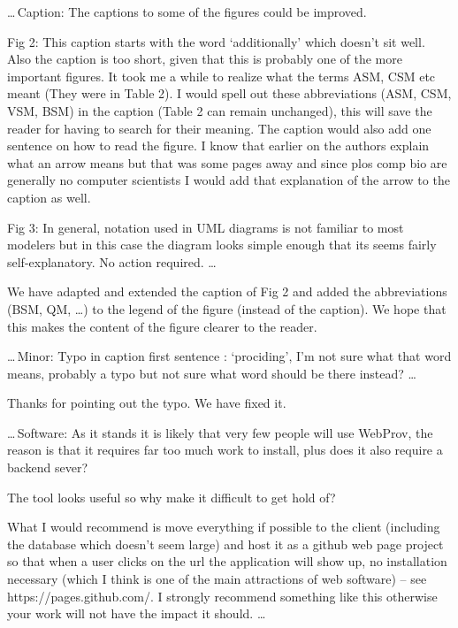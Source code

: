 \documentclass{article}
\begin{document}
\begin{mdframed}
\ldots\,Caption: The captions to some of the figures could be improved.

Fig 2: This caption starts with the word ‘additionally’ which doesn’t sit well.
Also the caption is too short, given that this is probably one of the more important figures.
It took me a while to realize what the terms ASM, CSM etc meant (They were in Table 2).
I would spell out these abbreviations (ASM, CSM, VSM, BSM) in the caption (Table 2 can remain unchanged), this will save the reader for having to search for their meaning.
The caption would also add one sentence on how to read the figure.
I know that earlier on the authors explain what an arrow means but that was some pages away and since plos comp bio are generally no computer scientists I would add that explanation of the arrow to the caption as well.

Fig 3: In general, notation used in UML diagrams is not familiar to most modelers but in this case the diagram looks simple enough that its seems fairly self-explanatory. No action required. \ldots
\end{mdframed}

We have adapted and extended the caption of Fig 2 and added the abbreviations (BSM, QM, \dots) to the legend of the figure (instead of the caption).
We hope that this makes the content of the figure clearer to the reader.


\begin{mdframed}
\ldots\,Minor: Typo in caption first sentence : ‘prociding’, I’m not sure what that word means, probably a typo but not sure what word should be there instead? \ldots
\end{mdframed}

Thanks for pointing out the typo.
We have fixed it.

\begin{mdframed}
\ldots\,Software: As it stands it is likely that very few people will use WebProv, the reason is that it requires far too much work to install, plus does it also require a backend sever?

The tool looks useful so why make it difficult to get hold of?

What I would recommend is move everything if possible to the client (including the database which doesn’t seem large) and host it as a github web page project so that when a user clicks on the url the application will show up, no installation necessary (which I think is one of the main attractions of web software) – see https://pages.github.com/. I strongly recommend something like this otherwise your work will not have the impact it should. \ldots
\end{mdframed}
\end{document}
